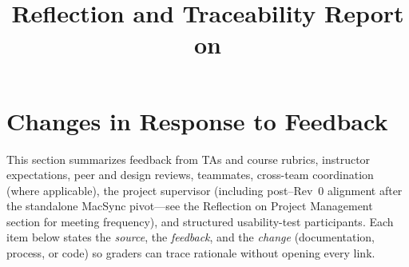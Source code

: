 \documentclass{article}
\title{Reflection and Traceability Report on \progname}
\author{\authname}
\date{}
\begin{document}
\maketitle


\section{Changes in Response to Feedback}

\noindent
This section summarizes feedback from TAs and course rubrics, instructor expectations,
peer and design reviews, teammates, cross-team coordination (where applicable), the
project supervisor (including post--Rev~0 alignment after the standalone MacSync pivot---see
the Reflection on Project Management section for meeting frequency), and structured
usability-test participants.
Each item below states the \emph{source}, the \emph{feedback}, and the \emph{change}
(documentation, process, or code) so graders can trace rationale without opening every link.\\

\end{document}
